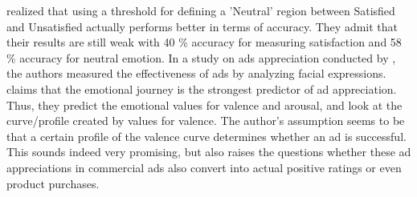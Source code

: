 \citet{Kamaruddin:2016:MeasuringCustomerSatisfaction} realized that using a threshold for defining a 'Neutral' region between Satisfied and Unsatisfied actually performs better in terms of accuracy. They admit that their results are still weak with 40 \% accuracy for measuring satisfaction and 58 \% accuracy for neutral emotion.
\newline\newline
In a study on ads appreciation conducted by \citet{Poirier:2016:AdsFacialExpression}, the authors measured the effectiveness of ads by analyzing facial expressions. \citet{Poirier:2016:AdsFacialExpression} claims that the emotional journey is the strongest predictor of ad appreciation. Thus, they predict the emotional values for valence and arousal, and look at the curve/profile created by values for valence. The author's assumption seems to be that a certain profile of the valence curve determines whether an ad is successful. This sounds indeed very promising, but also raises the questions whether these ad appreciations in commercial ads also convert into actual positive ratings or even product purchases.
